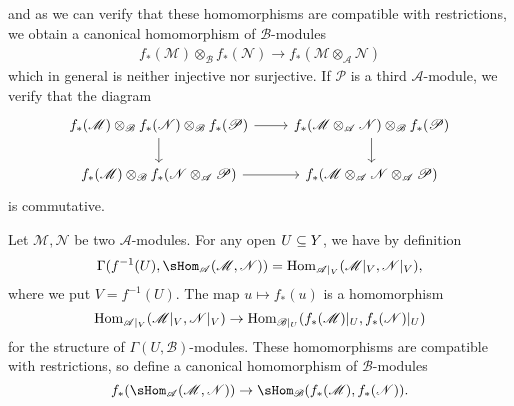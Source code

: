 and as we can verify that these homomorphisms are compatible with restrictions, we obtain a canonical homomorphism of $\mathscr{B}$-modules
\begin{align}\label{ringed space direct image and tensor-1}
f_*(\mathscr{M})\otimes_{\mathscr{B}}f_*(\mathscr{N})\to f_*(\mathscr{M}\otimes_{\mathscr{A}}\mathscr{N})
\end{align}
which in general is neither injective nor surjective. If $\mathscr{P}$ is a third $\mathscr{A}$-module, we verify that the diagram
\[\begin{tikzcd}
f_*(\mathscr{M})\otimes_{\mathscr{B}}f_*(\mathscr{N})\otimes_{\mathscr{B}}f_*(\mathscr{P})\ar[r]\ar[d]&f_*(\mathscr{M}\otimes_{\mathscr{A}}\mathscr{N})\otimes_{\mathscr{B}}f_*(\mathscr{P})\ar[d]\\
f_*(\mathscr{M})\otimes_{\mathscr{B}}f_*(\mathscr{N}\otimes_{\mathscr{A}}\mathscr{P})\ar[r]&f_*(\mathscr{M}\otimes_{\mathscr{A}}\mathscr{N}\otimes_{\mathscr{A}}\mathscr{P})
\end{tikzcd}\]
is commutative.\par
Let $\mathscr{M},\mathscr{N}$ be two $\mathscr{A}$-modules. For any open $U\subseteq Y$, we have by definition
\[\Gamma(f^{-1}(U),\sHom_{\mathscr{A}}(\mathscr{M},\mathscr{N}))=\Hom_{\mathscr{A}|_V}(\mathscr{M}|_V,\mathscr{N}|_V),\]
where we put $V=f^{-1}(U)$. The map $u\mapsto f_*(u)$ is a homomorphism
\[\mathrm{Hom}_{\mathscr{A}|_V}(\mathscr{M}|_V,\mathscr{N}|_V)\to\mathrm{Hom}_{\mathscr{B}|_U}(f_*(\mathscr{M})|_U,f_*(\mathscr{N})|_U)\]
for the structure of $\Gamma(U,\mathscr{B})$-modules. These homomorphisms are compatible with restrictions, so define a canonical homomorphism of $\mathscr{B}$-modules
\[f_*(\sHom_{\mathscr{A}}(\mathscr{M},\mathscr{N}))\to\sHom_{\mathscr{B}}(f_*(\mathscr{M}),f_*(\mathscr{N})).\]

